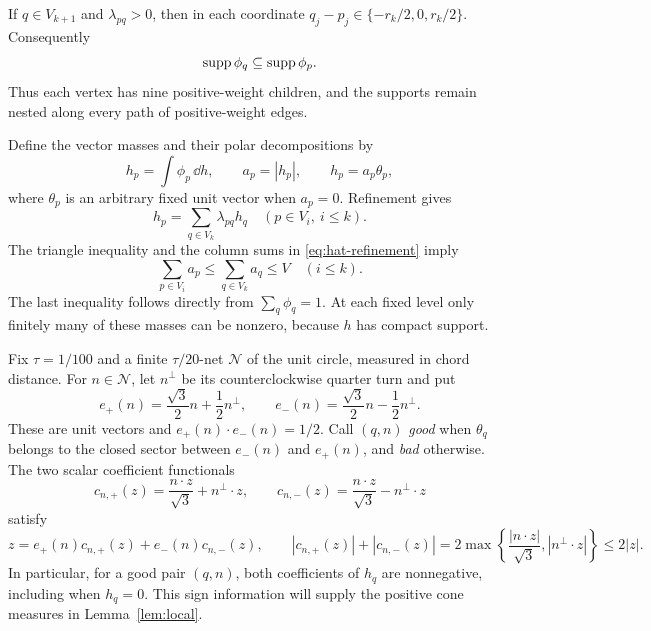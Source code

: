 If $q\in V_{k+1}$ and $\lambda_{pq}>0$, then in each coordinate
$q_j-p_j\in\{-r_k/2,0,r_k/2\}$. Consequently
\begin{equation}
 \operatorname{supp}\phi_q\subseteq\operatorname{supp}\phi_p.
 \label{eq:prices-support-nesting}
\end{equation}
Thus each vertex has nine positive-weight children, and the supports
remain nested along every path of positive-weight edges.

Define the vector masses and their polar decompositions by
\[
 h_p=\int\phi_p\,\dd h,
 \qquad a_p=|h_p|,
 \qquad h_p=a_p\theta_p,
\]
where $\theta_p$ is an arbitrary fixed unit vector when $a_p=0$.
Refinement gives
\[
 h_p=\sum_{q\in V_k}\lambda_{pq}h_q
 \quad(p\in V_i,\ i\le k).
\]
The triangle inequality and the column sums in
\eqref{eq:hat-refinement} imply
\begin{equation}
 \sum_{p\in V_i}a_p
 \le\sum_{q\in V_k}a_q
 \le V
 \quad(i\le k).
 \label{eq:prices-vector-mass-budget}
\end{equation}
The last inequality follows directly from $\sum_q\phi_q=1$.
At each fixed level only finitely many of these masses can be nonzero,
because $h$ has compact support.

Fix $\tau=1/100$ and a finite $\tau/20$-net $\mathcal N$ of the unit
circle, measured in chord distance. For $n\in\mathcal N$, let $n^\perp$
be its counterclockwise quarter turn and put
\[
 e_+(n)=\frac{\sqrt3}{2}n+\frac12n^\perp,
 \qquad
 e_-(n)=\frac{\sqrt3}{2}n-\frac12n^\perp.
\]
These are unit vectors and $e_+(n)\cdot e_-(n)=1/2$.
Call $(q,n)$ \emph{good} when $\theta_q$ belongs to the closed sector
between $e_-(n)$ and $e_+(n)$, and \emph{bad} otherwise.
The two scalar coefficient functionals
\begin{equation}
 c_{n,+}(z)=\frac{n\cdot z}{\sqrt3}+n^\perp\cdot z,
 \qquad
 c_{n,-}(z)=\frac{n\cdot z}{\sqrt3}-n^\perp\cdot z
 \label{eq:prices-scalar-coordinates}
\end{equation}
satisfy
\[
 z=e_+(n)c_{n,+}(z)+e_-(n)c_{n,-}(z),
 \qquad
 |c_{n,+}(z)|+|c_{n,-}(z)|
 =2\max\left\{\frac{|n\cdot z|}{\sqrt3},
                     |n^\perp\cdot z|\right\}
 \le2|z|.
\]
In particular, for a good pair $(q,n)$, both coefficients of $h_q$ are
nonnegative, including when $h_q=0$. This sign information will supply
the positive cone measures in Lemma~\ref{lem:local}.

